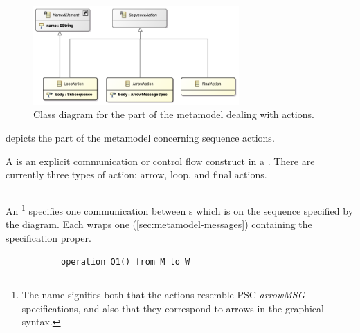 \begin{figure}
	\centering
	\includegraphics[width=0.7\textwidth]{diagrams/actions.png}
	\caption{Class diagram for the part of the \langname{} metamodel dealing with actions.}
	\label{fig:metamodel-actions}
\end{figure}

 depicts the part of the metamodel concerning
sequence actions.

A \msequenceaction{} is an explicit communication or control flow construct in a
\msubsequence.  There are currently three types of action: arrow, loop, and
final actions.

\subsection{\marrowaction}

An \marrowaction\footnote{The name signifies both that the actions resemble
PSC \emph{arrowMSG} specifications, and also that they correspond to arrows in
the graphical syntax.} specifies one communication between \mactor s which is on
the sequence specified by the diagram.  Each \marrowaction{} wraps one
\marrowmessagespec{} (\cref{sec:metamodel-messages})
containing the specification proper.

\begin{figure}[h]

\begin{subfigure}[t]{0.38\textwidth}
\begin{lstlisting}[style=Example]
operation O1() from M to W
\end{lstlisting}
\end{subfigure}
\hfill
\begin{subfigure}[t]{0.58\textwidth}
\gsecaption
\centering
{}
\end{subfigure}

\end{figure}

